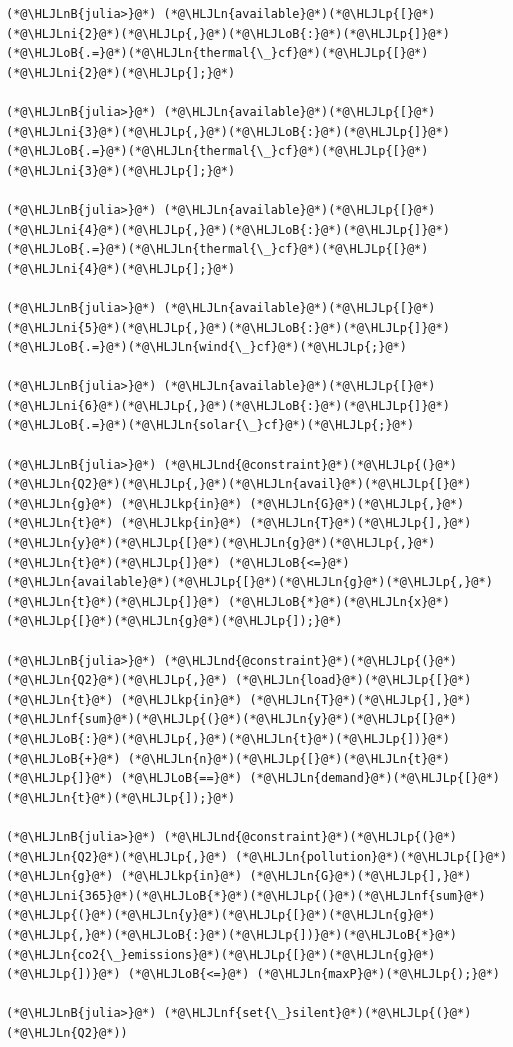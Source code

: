 \documentclass[12pt,a4paper]{article}
\newcommand{\HLJLkp}[1]{\textcolor[RGB]{148,91,176}{\textbf{#1}}}
\newcommand{\HLJLn}[1]{#1}
\newcommand{\HLJLnd}[1]{\textcolor[RGB]{214,102,97}{#1}}
\newcommand{\HLJLnf}[1]{\textcolor[RGB]{66,102,213}{#1}}
\newcommand{\HLJLnB}[1]{\textcolor[RGB]{59,151,46}{#1}}
\newcommand{\HLJLni}[1]{\textcolor[RGB]{59,151,46}{#1}}
\newcommand{\HLJLoB}[1]{\textcolor[RGB]{102,102,102}{\textbf{#1}}}
\newcommand{\HLJLp}[1]{#1}
\begin{document}
\begin{lstlisting}
(*@\HLJLnB{julia>}@*) (*@\HLJLn{available}@*)(*@\HLJLp{[}@*)(*@\HLJLni{2}@*)(*@\HLJLp{,}@*)(*@\HLJLoB{:}@*)(*@\HLJLp{]}@*) (*@\HLJLoB{.=}@*)(*@\HLJLn{thermal{\_}cf}@*)(*@\HLJLp{[}@*)(*@\HLJLni{2}@*)(*@\HLJLp{];}@*)

(*@\HLJLnB{julia>}@*) (*@\HLJLn{available}@*)(*@\HLJLp{[}@*)(*@\HLJLni{3}@*)(*@\HLJLp{,}@*)(*@\HLJLoB{:}@*)(*@\HLJLp{]}@*) (*@\HLJLoB{.=}@*)(*@\HLJLn{thermal{\_}cf}@*)(*@\HLJLp{[}@*)(*@\HLJLni{3}@*)(*@\HLJLp{];}@*)

(*@\HLJLnB{julia>}@*) (*@\HLJLn{available}@*)(*@\HLJLp{[}@*)(*@\HLJLni{4}@*)(*@\HLJLp{,}@*)(*@\HLJLoB{:}@*)(*@\HLJLp{]}@*) (*@\HLJLoB{.=}@*)(*@\HLJLn{thermal{\_}cf}@*)(*@\HLJLp{[}@*)(*@\HLJLni{4}@*)(*@\HLJLp{];}@*)

(*@\HLJLnB{julia>}@*) (*@\HLJLn{available}@*)(*@\HLJLp{[}@*)(*@\HLJLni{5}@*)(*@\HLJLp{,}@*)(*@\HLJLoB{:}@*)(*@\HLJLp{]}@*) (*@\HLJLoB{.=}@*)(*@\HLJLn{wind{\_}cf}@*)(*@\HLJLp{;}@*)

(*@\HLJLnB{julia>}@*) (*@\HLJLn{available}@*)(*@\HLJLp{[}@*)(*@\HLJLni{6}@*)(*@\HLJLp{,}@*)(*@\HLJLoB{:}@*)(*@\HLJLp{]}@*) (*@\HLJLoB{.=}@*)(*@\HLJLn{solar{\_}cf}@*)(*@\HLJLp{;}@*)

(*@\HLJLnB{julia>}@*) (*@\HLJLnd{@constraint}@*)(*@\HLJLp{(}@*)(*@\HLJLn{Q2}@*)(*@\HLJLp{,}@*)(*@\HLJLn{avail}@*)(*@\HLJLp{[}@*)(*@\HLJLn{g}@*) (*@\HLJLkp{in}@*) (*@\HLJLn{G}@*)(*@\HLJLp{,}@*) (*@\HLJLn{t}@*) (*@\HLJLkp{in}@*) (*@\HLJLn{T}@*)(*@\HLJLp{],}@*)(*@\HLJLn{y}@*)(*@\HLJLp{[}@*)(*@\HLJLn{g}@*)(*@\HLJLp{,}@*)(*@\HLJLn{t}@*)(*@\HLJLp{]}@*) (*@\HLJLoB{<=}@*) (*@\HLJLn{available}@*)(*@\HLJLp{[}@*)(*@\HLJLn{g}@*)(*@\HLJLp{,}@*)(*@\HLJLn{t}@*)(*@\HLJLp{]}@*) (*@\HLJLoB{*}@*)(*@\HLJLn{x}@*)(*@\HLJLp{[}@*)(*@\HLJLn{g}@*)(*@\HLJLp{]);}@*)

(*@\HLJLnB{julia>}@*) (*@\HLJLnd{@constraint}@*)(*@\HLJLp{(}@*)(*@\HLJLn{Q2}@*)(*@\HLJLp{,}@*) (*@\HLJLn{load}@*)(*@\HLJLp{[}@*)(*@\HLJLn{t}@*) (*@\HLJLkp{in}@*) (*@\HLJLn{T}@*)(*@\HLJLp{],}@*) (*@\HLJLnf{sum}@*)(*@\HLJLp{(}@*)(*@\HLJLn{y}@*)(*@\HLJLp{[}@*)(*@\HLJLoB{:}@*)(*@\HLJLp{,}@*)(*@\HLJLn{t}@*)(*@\HLJLp{])}@*)(*@\HLJLoB{+}@*) (*@\HLJLn{n}@*)(*@\HLJLp{[}@*)(*@\HLJLn{t}@*)(*@\HLJLp{]}@*) (*@\HLJLoB{==}@*) (*@\HLJLn{demand}@*)(*@\HLJLp{[}@*)(*@\HLJLn{t}@*)(*@\HLJLp{]);}@*)

(*@\HLJLnB{julia>}@*) (*@\HLJLnd{@constraint}@*)(*@\HLJLp{(}@*)(*@\HLJLn{Q2}@*)(*@\HLJLp{,}@*) (*@\HLJLn{pollution}@*)(*@\HLJLp{[}@*)(*@\HLJLn{g}@*) (*@\HLJLkp{in}@*) (*@\HLJLn{G}@*)(*@\HLJLp{],}@*) (*@\HLJLni{365}@*)(*@\HLJLoB{*}@*)(*@\HLJLp{(}@*)(*@\HLJLnf{sum}@*)(*@\HLJLp{(}@*)(*@\HLJLn{y}@*)(*@\HLJLp{[}@*)(*@\HLJLn{g}@*)(*@\HLJLp{,}@*)(*@\HLJLoB{:}@*)(*@\HLJLp{])}@*)(*@\HLJLoB{*}@*)(*@\HLJLn{co2{\_}emissions}@*)(*@\HLJLp{[}@*)(*@\HLJLn{g}@*)(*@\HLJLp{])}@*) (*@\HLJLoB{<=}@*) (*@\HLJLn{maxP}@*)(*@\HLJLp{);}@*)

(*@\HLJLnB{julia>}@*) (*@\HLJLnf{set{\_}silent}@*)(*@\HLJLp{(}@*)(*@\HLJLn{Q2}@*))
\end{lstlisting}
\end{document}
